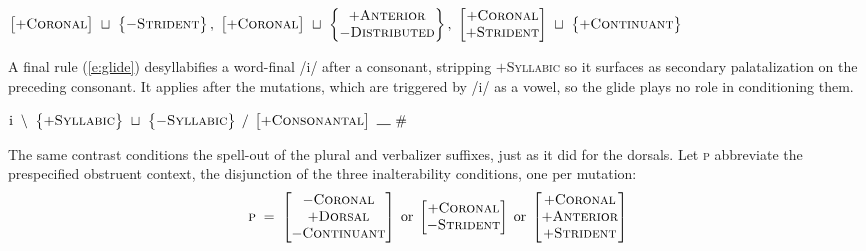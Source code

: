\documentclass[11pt,letterpaper]{article}
\newcommand{\gap}{\rule{1em}{0.5pt}}
\newcommand{\featspec}[2]{\ensuremath{#1}\textsc{#2}}
\begin{document}
\begin{unlabeledexample}
\small\hfill$\displaystyle
\begin{bmatrix}
\featspec{+}{Coronal}
\end{bmatrix}
~\sqcup~
\begin{Bmatrix}
\featspec{-}{Strident}
\end{Bmatrix},~
\begin{bmatrix}
\featspec{+}{Coronal}
\end{bmatrix}
~\sqcup~
\begin{Bmatrix}
\featspec{+}{Anterior}\\
\featspec{-}{Distributed}
\end{Bmatrix},~
\begin{bmatrix}
\featspec{+}{Coronal}\\
\featspec{+}{Strident}
\end{bmatrix}
~\sqcup~
\begin{Bmatrix}
\featspec{+}{Continuant}
\end{Bmatrix}
$\hfill\null
\label{e:cor-default}
\end{unlabeledexample}

\noindent
A final rule (\ref{e:glide}) desyllabifies a word-final /i/ after a consonant, stripping \featspec{+}{Syllabic} so it surfaces as secondary palatalization on the preceding consonant.
It applies after the mutations, which are triggered by /i/ as a vowel, so the glide plays no role in conditioning them.

\begin{unlabeledexample}
\small\hfill$\displaystyle
\text{i}~\setminus~
\begin{Bmatrix}
\featspec{+}{Syllabic}
\end{Bmatrix}
~\sqcup~
\begin{Bmatrix}
\featspec{-}{Syllabic}
\end{Bmatrix}
\;/\;
\begin{bmatrix}
\featspec{+}{Consonantal}
\end{bmatrix}
~\gap~\#
$\hfill\null
\label{e:glide}
\end{unlabeledexample}

\bigskip\noindent
The same contrast conditions the spell-out of the plural and verbalizer suffixes, just as it did for the dorsals.
Let \textsc{p} abbreviate the prespecified obstruent context, the disjunction of the three inalterability conditions, one per mutation:
\[
\textsc{p} \;=\;
\begin{bmatrix}
\featspec{-}{Coronal}\\
\featspec{+}{Dorsal}\\
\featspec{-}{Continuant}
\end{bmatrix}
\;\textrm{or}\;
\begin{bmatrix}
\featspec{+}{Coronal}\\
\featspec{-}{Strident}
\end{bmatrix}
\;\textrm{or}\;
\begin{bmatrix}
\featspec{+}{Coronal}\\
\featspec{+}{Anterior}\\
\featspec{+}{Strident}
\end{bmatrix}
\]
\end{document}
